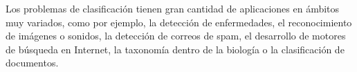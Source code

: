 Los problemas de clasificación tienen gran cantidad de aplicaciones en ámbitos muy variados, como por ejemplo, la detección de enfermedades, el reconocimiento de imágenes o sonidos, la detección de correos de spam, el desarrollo de motores de búsqueda en Internet, la taxonomía dentro de la biología o la clasificación de documentos.









\endinput
